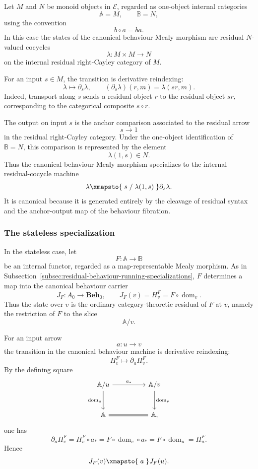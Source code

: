 Let \(M\) and \(N\) be monoid objects in \(\mathcal E\), regarded as one-object internal categories
\[
    \mathbb A=M,
    \qquad
    \mathbb B=N,
\]
using the convention
\[
    b\circ a=ba.
\]
In this case the states of the canonical behaviour Mealy morphism are residual \(N\)-valued cocycles
\[
    \lambda:M\times M\to N
\]
on the internal residual right-Cayley category of \(M\).

For an input \(s\in M\), the transition is derivative reindexing:
\[
    \lambda\longmapsto\partial_s\lambda,
    \qquad
    (\partial_s\lambda)(r,m)=\lambda(sr,m).
\]
Indeed, transport along \(s\) sends a residual object \(r\) to the residual object \(sr\), corresponding to the categorical composite \(s\circ r\).

The output on input \(s\) is the anchor comparison associated to the residual arrow
\[
    s\longrightarrow 1
\]
in the residual right-Cayley category. Under the one-object identification of \(\mathbb B=N\), this comparison is represented by the element
\[
    \lambda(1,s)\in N.
\]
Thus the canonical behaviour Mealy morphism specializes to the internal residual-cocycle machine
\[
    \lambda
        \xmapsto{\;s\;/\;\lambda(1,s)\;}
    \partial_s\lambda.
\]
It is canonical because it is generated entirely by the cleavage of residual syntax and the anchor-output map of the behaviour fibration.

\subsubsection{The stateless specialization}

In the stateless case, let
\[
    F:\mathbb A\to\mathbb B
\]
be an internal functor, regarded as a map-representable Mealy morphism. As in Subsection~\ref{subsec:residual-behaviour-running-specializations}, \(F\) determines a map into the canonical behaviour carrier
\[
    J_F:A_0\to \mathbf{Beh}_0,
    \qquad
    J_F(v)=H^F_v=F\circ\operatorname{dom}_v.
\]
Thus the state over \(v\) is the ordinary category-theoretic residual of \(F\) at \(v\), namely the restriction of \(F\) to the slice
\[
    \mathbb A/v.
\]

For an input arrow
\[
    a:u\to v
\]
the transition in the canonical behaviour machine is derivative reindexing:
\[
    H^F_v\longmapsto \partial_a H^F_v.
\]
By the defining square
\[
    \begin{tikzcd}[column sep=huge, row sep=large]
            \mathbb A/u
                \arrow[r, "a_*"]
                \arrow[d, "\operatorname{dom}_u"']
        &
            \mathbb A/v
                \arrow[d, "\operatorname{dom}_v"]
        \\
            \mathbb A
                \arrow[r, equal]
        &
            \mathbb A,
    \end{tikzcd}
\]
one has
\[
    \partial_aH^F_v
        =
    H^F_v\circ a_*
        =
    F\circ\operatorname{dom}_v\circ a_*
        =
    F\circ\operatorname{dom}_u
        =
    H^F_u.
\]
Hence
\[
    J_F(v)\xmapsto{\;a\;}J_F(u).
\]


